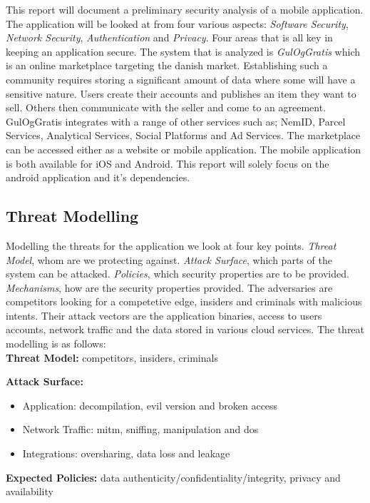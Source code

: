 This report will document a preliminary security analysis of a mobile application. The application will be looked at from four various aspects: \textit{Software Security}, \textit{Network Security}, \textit{Authentication} and \textit{Privacy}. Four areas that is all key in keeping an application secure. The system that is analyzed is \textit{GulOgGratis} which is an online marketplace targeting the danish market. Establishing such a community requires storing a significant amount of data where some will have a sensitive nature. Users create their accounts and publishes an item they want to sell. Others then communicate with the seller and come to an agreement. GulOgGratis integrates with a range of other services such as; NemID, Parcel Services, Analytical Services, Social Platforms and Ad Services. The marketplace can be accessed either as a website or mobile application. The mobile application is both available for iOS and Android. This report will solely focus on the android application and it's dependencies.  

\subsection{Threat Modelling}
 Modelling the threats for the application we look at four key points. \textit{Threat Model},  whom are we protecting against. \textit{Attack Surface}, which parts of the system can be attacked. \textit{Policies}, which security properties are to be provided. \textit{Mechanisms}, how are the security properties provided. The adversaries are competitors looking for a competetive edge, insiders and criminals with malicious intents. Their attack vectors are the application binaries, access to users accounts, network traffic and the data stored in various cloud services. The threat modelling is as follows:\\       


\noindent\textbf{Threat Model:} competitors, insiders, criminals

\noindent\textbf{Attack Surface:}
\begin{itemize}
    \item Application: decompilation, evil version and broken access 
    \item Network Traffic: mitm, sniffing, manipulation and dos
    \item Integrations: oversharing, data loss and leakage
\end{itemize}

\noindent\textbf{Expected Policies:} data authenticity/confidentiality/integrity, privacy and availability 

